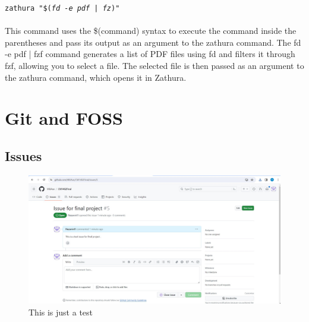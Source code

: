 \documentclass[12pt]{article}
\begin{document}
\texttt{zathura "\$(\textit{fd -e pdf | fz})"}\\
\\This command uses the \$(command) syntax to execute the command inside the parentheses and pass its output as an argument to the zathura command. The fd -e pdf | fzf command generates a list of PDF files using fd and filters it through fzf, allowing you to select a file. The selected file is then passed as an argument to the zathura command, which opens it in Zathura.

\section{Git and FOSS}
\subsection{Issues}

\begin{figure}[h]
    \centering
    \includegraphics[width=0.6\linewidth]{Screenshot}
	\caption{This is just a test}
	
\end{figure}
\end{document}
